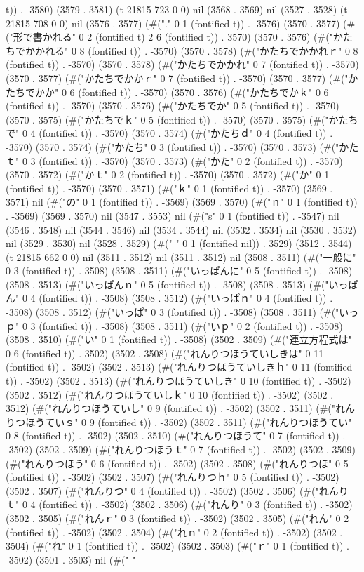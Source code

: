 t)) . -3580) (3579 . 3581) (t 21815 723 0 0) nil (3568 . 3569) nil (3527 . 3528) (t 21815 708 0 0) nil (3576 . 3577) (#("." 0 1 (fontified t)) . -3576) (3570 . 3577) (#("形で書かれる" 0 2 (fontified t) 2 6 (fontified t)) . 3570) (3570 . 3576) (#("かたちでかかれる" 0 8 (fontified t)) . -3570) (3570 . 3578) (#("かたちでかかれｒ" 0 8 (fontified t)) . -3570) (3570 . 3578) (#("かたちでかかれ" 0 7 (fontified t)) . -3570) (3570 . 3577) (#("かたちでかかｒ" 0 7 (fontified t)) . -3570) (3570 . 3577) (#("かたちでかか" 0 6 (fontified t)) . -3570) (3570 . 3576) (#("かたちでかｋ" 0 6 (fontified t)) . -3570) (3570 . 3576) (#("かたちでか" 0 5 (fontified t)) . -3570) (3570 . 3575) (#("かたちでｋ" 0 5 (fontified t)) . -3570) (3570 . 3575) (#("かたちで" 0 4 (fontified t)) . -3570) (3570 . 3574) (#("かたちｄ" 0 4 (fontified t)) . -3570) (3570 . 3574) (#("かたち" 0 3 (fontified t)) . -3570) (3570 . 3573) (#("かたｔ" 0 3 (fontified t)) . -3570) (3570 . 3573) (#("かた" 0 2 (fontified t)) . -3570) (3570 . 3572) (#("かｔ" 0 2 (fontified t)) . -3570) (3570 . 3572) (#("か" 0 1 (fontified t)) . -3570) (3570 . 3571) (#("ｋ" 0 1 (fontified t)) . -3570) (3569 . 3571) nil (#("の" 0 1 (fontified t)) . -3569) (3569 . 3570) (#("ｎ" 0 1 (fontified t)) . -3569) (3569 . 3570) nil (3547 . 3553) nil (#("s" 0 1 (fontified t)) . -3547) nil (3546 . 3548) nil (3544 . 3546) nil (3534 . 3544) nil (3532 . 3534) nil (3530 . 3532) nil (3529 . 3530) nil (3528 . 3529) (#(" " 0 1 (fontified nil)) . 3529) (3512 . 3544) (t 21815 662 0 0) nil (3511 . 3512) nil (3511 . 3512) nil (3508 . 3511) (#("一般に" 0 3 (fontified t)) . 3508) (3508 . 3511) (#("いっぱんに" 0 5 (fontified t)) . -3508) (3508 . 3513) (#("いっぱんｎ" 0 5 (fontified t)) . -3508) (3508 . 3513) (#("いっぱん" 0 4 (fontified t)) . -3508) (3508 . 3512) (#("いっぱｎ" 0 4 (fontified t)) . -3508) (3508 . 3512) (#("いっぱ" 0 3 (fontified t)) . -3508) (3508 . 3511) (#("いっｐ" 0 3 (fontified t)) . -3508) (3508 . 3511) (#("いｐ" 0 2 (fontified t)) . -3508) (3508 . 3510) (#("い" 0 1 (fontified t)) . -3508) (3502 . 3509) (#("連立方程式は" 0 6 (fontified t)) . 3502) (3502 . 3508) (#("れんりつほうていしきは" 0 11 (fontified t)) . -3502) (3502 . 3513) (#("れんりつほうていしきｈ" 0 11 (fontified t)) . -3502) (3502 . 3513) (#("れんりつほうていしき" 0 10 (fontified t)) . -3502) (3502 . 3512) (#("れんりつほうていしｋ" 0 10 (fontified t)) . -3502) (3502 . 3512) (#("れんりつほうていし" 0 9 (fontified t)) . -3502) (3502 . 3511) (#("れんりつほうていｓ" 0 9 (fontified t)) . -3502) (3502 . 3511) (#("れんりつほうてい" 0 8 (fontified t)) . -3502) (3502 . 3510) (#("れんりつほうて" 0 7 (fontified t)) . -3502) (3502 . 3509) (#("れんりつほうｔ" 0 7 (fontified t)) . -3502) (3502 . 3509) (#("れんりつほう" 0 6 (fontified t)) . -3502) (3502 . 3508) (#("れんりつほ" 0 5 (fontified t)) . -3502) (3502 . 3507) (#("れんりつｈ" 0 5 (fontified t)) . -3502) (3502 . 3507) (#("れんりつ" 0 4 (fontified t)) . -3502) (3502 . 3506) (#("れんりｔ" 0 4 (fontified t)) . -3502) (3502 . 3506) (#("れんり" 0 3 (fontified t)) . -3502) (3502 . 3505) (#("れんｒ" 0 3 (fontified t)) . -3502) (3502 . 3505) (#("れん" 0 2 (fontified t)) . -3502) (3502 . 3504) (#("れｎ" 0 2 (fontified t)) . -3502) (3502 . 3504) (#("れ" 0 1 (fontified t)) . -3502) (3502 . 3503) (#("ｒ" 0 1 (fontified t)) . -3502) (3501 . 3503) nil (#(" " 